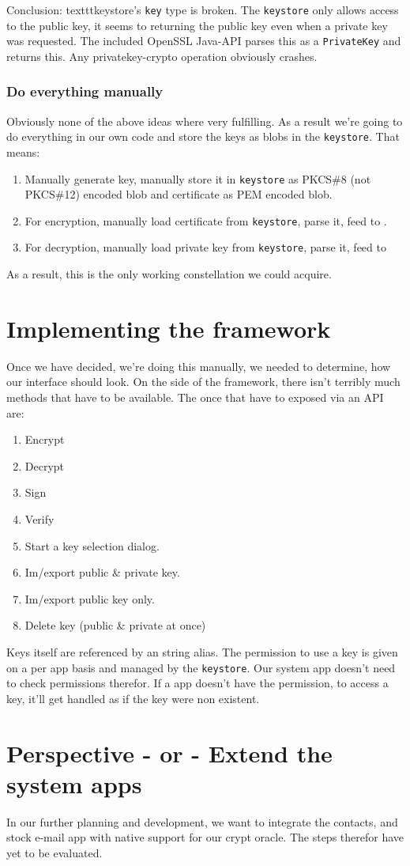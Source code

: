\documentclass[a4paper,draft]{scrartcl}
\begin{document}
			Conclusion:
			texttt{keystore}'s \texttt{key} type is broken. The \texttt{keystore} only allows access to the public key, it seems to returning the public key even when a private key was requested. The included OpenSSL Java-API parses this as a \texttt{PrivateKey} and returns this. Any privatekey-crypto operation obviously crashes.
		
		\subsubsection{Do everything manually}
			Obviously none of the above ideas where very fulfilling. As a result we're going to do everything in our own code and store the keys as blobs in the \texttt{keystore}. That means:
			\begin{enumerate}
				\item Manually generate key, manually store it in \texttt{keystore} as PKCS\#8 (not PKCS\#12) encoded blob and certificate as PEM encoded blob.
				\item For encryption, manually load certificate from \texttt{keystore}, parse it, feed to .
				\item For decryption, manually load private key from \texttt{keystore}, parse it, feed to 
			\end{enumerate}
			As a result, this is the only working constellation we could acquire.

\section{Implementing the framework}
	Once we have decided, we're doing this manually, we needed to determine, how our interface should look. On the side of the framework, there isn't terribly much methods that have to be available. The once that have to exposed via an API are:
	\begin{enumerate} %
		\item Encrypt
		\item Decrypt
		\item Sign
		\item Verify
		\item Start a key selection dialog.
		\item Im/export public \& private key.
		\item Im/export public key only.
		\item Delete key (public \& private at once)
	\end{enumerate}
	Keys itself are referenced by an string alias. The permission to use a key is given on a per app basis and managed by the \texttt{keystore}. Our system app doesn't need to check permissions therefor. If a app doesn't have the permission, to access a key, it'll get handled as if the key were non existent.

\section{Perspective - or - Extend the system apps}
In our further planning and development, we want to integrate the contacts, and stock e-mail app with native support for our crypt oracle. The steps therefor have yet to be evaluated.
\end{document}
